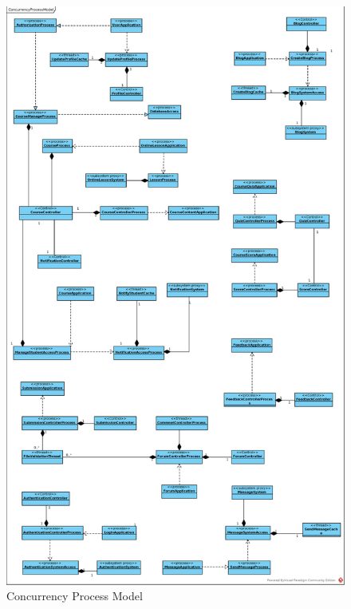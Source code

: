 \documentclass[./../main.tex]{subfiles}
\begin{document}
	\begin{figure}[H]
		\centering
		\includegraphics[width=0.78\linewidth]{./images/ConcurrencyProcessModel.eps}
		\caption{Concurrency Process Model}
	\end{figure}
\end{document}
